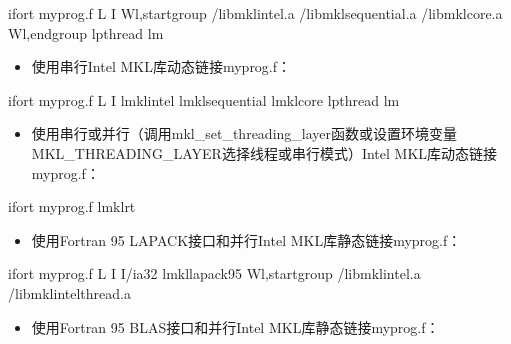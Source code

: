 \documentclass[a4paper,12pt,english]{sphinxmanual}
\begin{document}
\begin{sphinxVerbatim}[commandchars=\\\{\}]
ifort myprog.f \PYGZhy{}L \PYGZhy{}I 
\PYGZhy{}Wl,\PYGZhy{}\PYGZhy{}start\PYGZhy{}group /libmkl\PYGZus{}intel.a /libmkl\PYGZus{}sequential.a 
/libmkl\PYGZus{}core.a \PYGZhy{}Wl,\PYGZhy{}\PYGZhy{}end\PYGZhy{}group \PYGZhy{}lpthread \PYGZhy{}lm
\end{sphinxVerbatim}
\begin{itemize}
\item {} 
\sphinxAtStartPar
使用串行Intel MKL库动态链接myprog.f：

\end{itemize}

\begin{sphinxVerbatim}[commandchars=\\\{\}]
ifort myprog.f \PYGZhy{}L \PYGZhy{}I \PYGZhy{}lmkl\PYGZus{}intel \PYGZhy{}lmkl\PYGZus{}sequential \PYGZhy{}lmkl\PYGZus{}core \PYGZhy{}lpthread \PYGZhy{}lm
\end{sphinxVerbatim}
\begin{itemize}
\item {} 
\sphinxAtStartPar
使用串行或并行（调用mkl\_set\_threading\_layer函数或设置环境变量MKL\_THREADING\_LAYER选择线程或串行模式）Intel MKL库动态链接myprog.f：

\end{itemize}

\begin{sphinxVerbatim}[commandchars=\\\{\}]
ifort myprog.f \PYGZhy{}lmkl\PYGZus{}rt
\end{sphinxVerbatim}
\begin{itemize}
\item {} 
\sphinxAtStartPar
使用Fortran 95 LAPACK接口和并行Intel MKL库静态链接myprog.f：

\end{itemize}

\begin{sphinxVerbatim}[commandchars=\\\{\}]
ifort myprog.f \PYGZhy{}L \PYGZhy{}I \PYGZhy{}I/ia32 \PYGZhy{}lmkl\PYGZus{}lapack95 
\PYGZhy{}Wl,\PYGZhy{}\PYGZhy{}start\PYGZhy{}group /libmkl\PYGZus{}intel.a /libmkl\PYGZus{}intel\PYGZus{}thread.a
\end{sphinxVerbatim}
\begin{itemize}
\item {} 
\sphinxAtStartPar
使用Fortran 95 BLAS接口和并行Intel MKL库静态链接myprog.f：

\end{itemize}
\end{document}
